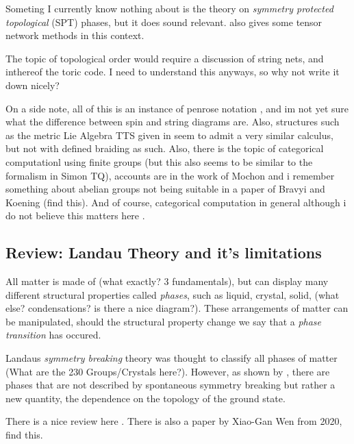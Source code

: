 Someting I currently know nothing about is the theory on \emph{symmetry protected topological} (SPT) phases, but it does sound relevant. \cite{degrootTopologicalPhasesSymmetries2022} also gives some tensor network methods in this context.

The topic of topological order would require a discussion of string nets, and inthereof the toric code. I need to understand this anyways, so why not write it down nicely? 

On a side note, all of this is an instance of penrose notation \cite{Penrose1971Applications}, and im not yet sure what the difference between spin and string diagrams are. Also, structures such as the metric Lie Algebra TTS given in \cite{nlab:tree_tensor_network_state} seem to admit a very similar calculus, but not with defined braiding as such. Also, there is the topic of categorical computationl using finite groups (but this also seems to be similar to the formalism in Simon TQ), accounts are in the work of Mochon \cite{mochonAnyonsNonsolvableFinite2003}\cite{mochonAnyonComputersSmaller2004a} and i remember something about abelian groups not being suitable in a paper of Bravyi and Koening (find this). And of course, categorical computation in general although i do not believe this matters here \cite{kongCategoricalComputation2023}.

\subsection{Review: Landau Theory and it's limitations}

All matter is made of (what exactly? 3 fundamentals), but can display many different structural properties called \emph{phases}, such as liquid, crystal, solid, (what else? condensations? is there a nice diagram?). These arrangements of matter can be manipulated, should the structural property change we say that a \emph{phase transition} has occured.

Landaus \emph{symmetry breaking} theory \cite{} was thought to classify all phases of matter (What are the 230 Groups/Crystals here?). However, as shown by \cite{wenTopologicalOrdersEdge1995}, there are phases that are not described by spontaneous symmetry breaking but rather a new quantity, the dependence on the topology of the ground state.

There is a nice review here \cite{wenTopologicalOrderLongrange2013}. There is also a paper by Xiao-Gan Wen from 2020, find this. 



